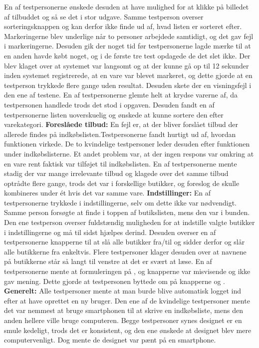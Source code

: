 En af testpersonerne ønskede desuden at have mulighed for at klikke på billedet af tilbuddet og så se det i stor udgave. Samme testperson overser sorteringsknappen og kan derfor ikke finde ud af, hvad listen er sorteret efter. Markeringerne blev underlige når to personer arbejdede samtidigt, og det gav fejl i markeringerne. Desuden gik der noget tid før testpersonerne lagde mærke til at en anden havde købt noget, og i de første tre test opdagede de det slet ikke. Der blev klaget over at systemet var langsomt og at der kunne gå op til 12 sekunder inden systemet registrerede, at en vare var blevet markeret, og dette gjorde at en testperson trykkede flere gange uden resultat. Desuden skete der en visningsfejl i den ene af testene. En af testpersonerne glemte helt at krydse varerne af, da testpersonen handlede trods det stod i opgaven. Desuden fandt en af testpersonerne listen uoverskuelig og ønskede at kunne sortere den efter varekategori.\newline
\newline
\textbf{Foreslåede tilbud:}\newline
En fejl er, at der bliver forslået tilbud der allerede findes på indkøbslisten.Testpersonerne fandt hurtigt ud af, hvordan funktionen virkede. De to kvindelige testpersoner leder desuden efter funktionen under indkøbslisterne. Et andet problem var, at der ingen respons var omkring at en vare rent faktisk var tilføjet til indkøbslisten. En af testpersonerne mente stadig der var mange irrelevante tilbud og klagede over det samme tilbud optrådte flere gange, trods det var i forskellige butikker, og foreslog de skulle kombineres under ét hvis det var samme vare.\newline
\newline
\textbf{Indstillinger:}\newline
En af testpersonerne trykkede  i indstillingerne, selv om dette ikke var nødvendigt. Samme person forsøgte at finde  i toppen af butikslisten, mens den var i bunden. Den ene testperson overser fuldstændig muligheden for at indstille valgte butikker i indstillingerne og må til sidst hjælpes derind. Desuden overser en af testpersonerne knapperne til at slå alle butikker fra/til og sidder derfor og slår alle butikkerne fra enkeltvis. Flere testpersoner klager desuden over at navnene på butikkerne står så langt til venstre at det er svært at læse. En af testpersonerne mente at formuleringen på ,  og  knapperne var misvisende og ikke gav mening. Dette gjorde at testpersonen byttede om på knapperne  og .\newline
\newline
\textbf{Generelt:}\newline
Alle testpersoner mente at man burde blive automatisk logget ind efter at have oprettet en ny bruger. Den ene af de kvindelige testpersoner mente det var nemmest at bruge smartphonen til at skrive en indkøbsliste, mens den anden hellere ville bruge computeren. Begge testpersoner synes designet er en smule kedeligt, trods det er konsistent, og den ene ønskede at designet blev mere computervenligt. Dog mente de designet var pænt på en smartphone.

